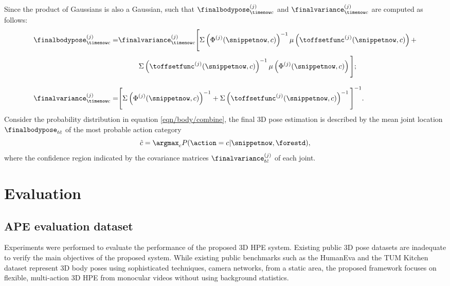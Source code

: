 Since the product of Gaussians is also a Gaussian, such that $\finalbodypose^{(j)}_{\timenow c}$ and $\finalvariance^{(j)}_{\timenow c}$ are computed as follows:  
\begin{equation}
	\label{eqn/body/combine2}
	\begin{split}
		\finalbodypose^{(j)}_{\timenow c} = & \finalvariance^{(j)}_{\timenow c} 
		\Bigg[
			\Sigma\left(\Phi^{(j)}(\snippetnow, c)\right)^{-1} 
			\mu\left(\toffsetfunc^{(j)}(\snippetnow, c)\right) + \\[1mm] 
			& \hspace{10mm} \Sigma\left(\toffsetfunc^{(j)}(\snippetnow, c)\right)^{-1} 
			\mu\left(\Phi^{(j)}(\snippetnow, c)\right)
		\Bigg];\\[3mm] 
		\finalvariance^{(j)}_{\timenow c} = &  
		\Bigg[
			\Sigma\left(\Phi^{(j)}(\snippetnow, c)\right)^{-1}
			+
			\Sigma\left(\toffsetfunc^{(j)}(\snippetnow, c)\right)^{-1} 
		\Bigg]^{-1}.
		\end{split}
	\end{equation}
	Consider the probability distribution in equation \ref{eqn/body/combine}, the final 3D pose estimation is described by the mean joint location $\finalbodypose_{t\hat{c}}$ of the most probable action category 
\begin{equation} 
	\hat{c} = \argmax_c  P(\action = c | \snippetnow, \forestd), 
\end{equation}
where the confidence region indicated by the covariance matrices $\finalvariance^{(j)}_{t\hat{c}}$ of each joint. 

\section{Evaluation}
\label{sec/body/evaluation}

\subsection{APE evaluation dataset}
Experiments were performed to evaluate the performance of the proposed 3D HPE system.
Existing public 3D pose datasets are inadequate to verify the main objectives of the proposed system.  
While existing public benchmarks such as the HumanEva \cite{Sigal2010} and the TUM Kitchen dataset \cite{Yao2012} represent 3D body poses using sophisticated techniques, \eg camera networks, from a static area, the proposed framework focuses on flexible, multi-action 3D HPE from monocular videos without using background statistics.

